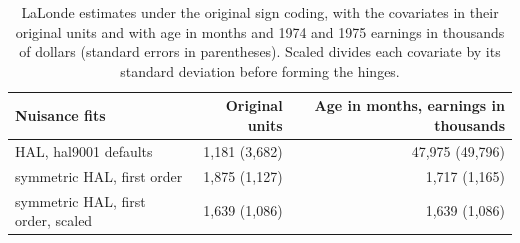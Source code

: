 \begin{table}[!h]
\centering
\caption{\label{tab:lalonde_units}LaLonde estimates under the original sign coding, with the covariates in their original units and with age in months and 1974 and 1975 earnings in thousands of dollars (standard errors in parentheses). Scaled divides each covariate by its standard deviation before forming the hinges.}
\centering
\begin{tabular}[t]{lrr}
\toprule
Nuisance fits & Original units & Age in months, earnings in thousands\\
\midrule
HAL, hal9001 defaults & 1,181 (3,682) & 47,975 (49,796)\\
symmetric HAL, first order & 1,875 (1,127) & 1,717 (1,165)\\
symmetric HAL, first order, scaled & 1,639 (1,086) & 1,639 (1,086)\\
\bottomrule
\end{tabular}
\end{table}
